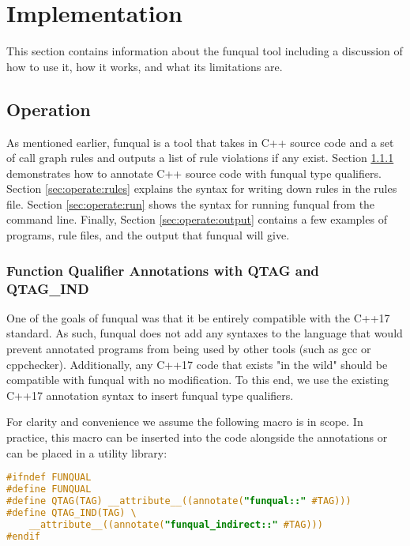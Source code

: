 \chapter{Implementation}\label{sec:implementation}

This section contains information about the funqual tool including a discussion of how to use it, how it works, and what its limitations are. 

\section{Operation}\label{sec:operation}

As mentioned earlier, funqual is a tool that takes in C++ source code and a set of call graph rules and outputs a list of rule violations if any exist.  Section \ref{sec:operate:annote} demonstrates how to annotate C++ source code with funqual type qualifiers.  Section \ref{sec:operate:rules} explains the syntax for writing down rules in the rules file.  Section \ref{sec:operate:run} shows the syntax for running funqual from the command line.  Finally, Section \ref{sec:operate:output} contains a few examples of programs, rule files, and the output that funqual will give.  

\subsection{Function Qualifier Annotations with QTAG and QTAG\_IND}\label{sec:operate:annote}

One of the goals of funqual was that it be entirely compatible with the C++17 standard.  As such, funqual does not add any syntaxes to the language that would prevent annotated programs from being used by other tools (such as gcc or cppchecker).  Additionally, any C++17 code that exists "in the wild" should be compatible with funqual with no modification.  To this end, we use the existing C++17 annotation syntax to insert funqual type qualifiers.  

For clarity and convenience we assume the following macro is in scope.  In practice, this macro can be inserted into the code alongside the annotations or can be placed in a utility library:

\noindent\begin{minipage}[t]{\linewidth}
\begin{lstlisting}[language=C,caption={}]
#ifndef FUNQUAL
#define FUNQUAL
#define QTAG(TAG) __attribute__((annotate("funqual::" #TAG)))
#define QTAG_IND(TAG) \
    __attribute__((annotate("funqual_indirect::" #TAG)))
#endif
\end{lstlisting}
\end{minipage}

